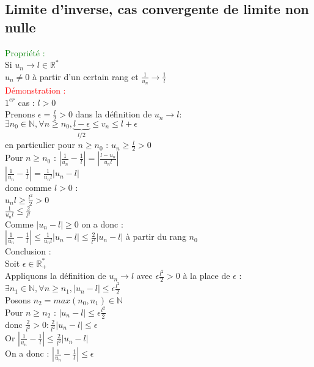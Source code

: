 \documentclass{article}
\begin{document}
\subsection{Limite d'inverse, cas convergente de limite non nulle }
\textcolor{green}{Propriété :} \\ 
Si $u_n \rightarrow l \in \mathbb{R}^*$ \\ 
$u_n \neq 0$ à partir d'un certain rang et $\frac{1}{u_n} \rightarrow \frac{
1}{l}$ \\
\textcolor{red}{Démonstration :} \\ 
$1^{er}$ cas : $l>0$ \\ 
Prenons $ \epsilon = \frac{l}{2}>0$ dans la définition de $u_n \rightarrow l$: \\ 
$\exists n_0 \in \mathbb{N}, \forall n \geq n_0, \underbrace{l- \epsilon}_{l/2} \leq v_n \leq l + \epsilon$ \\ 
en particulier pour $n \geq n_0$ : $u_n \geq \frac{l}{2} >0$ \\
Pour $n \geq n_0$ : $|\frac{1}{u_n}-\frac{1}{l}|=|\frac{l-u_n}{u_nl}|$ \\ 
$|\frac{1}{u_n}-\frac{1}{l}|= \frac{1}{u_nl}|u_n-l|$ \\ 
donc  comme  $l>0$ : \\ 
$u_n l \geq \frac{l^2}{2}>0$ \\ 
$\frac{1}{u_nl}\leq \frac{2}{l^2}$ \\ 
Comme $|u_n-l| \geq 0$ on a donc : \\ 
$|\frac{1}{u_n}-\frac{1}{l}| \leq \frac{1}{u_nl}|u_n-l| \leq \frac{2}{l^2}|u_n-l|$ à partir du rang $n_0$ \\
Conclusion : \\ 
Soit $\epsilon \in \mathbb{R}^*_+$ \\ 
Appliquons la définition de $u_n \rightarrow l$ avec $\epsilon \frac{l^2}{2}>0$ à la place de $ \epsilon$ : \\ 
$\exists n_1 \in \mathbb{N}, \forall n \geq n_1, |u_n-l| \leq \epsilon \frac{l^2}{2}$ \\ 
Posons $n_2=max(n_0,n_1) \in \mathbb{N}$ \\ 
Pour $n \geq n_2$ : $|u_n-l| \leq \epsilon \frac{l^2}{2}$ \\ 
donc $\frac{2}{l^2}>0: \frac{2}{l^2}|u_n - l| \leq \epsilon$  \\ 
Or $|\frac{1}{u_n}-\frac{1}{l}|\leq \frac{2}{l^2}|u_n - l|$ \\ 
On a donc : $|\frac{1}{u_n}-\frac{1}{l}|\leq \epsilon$ \\ 
\end{document}
